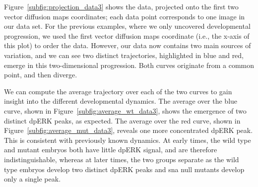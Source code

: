 \documentclass{pnastwo}
\begin{document}
\begin{article}
Figure~\ref{subfig:projection_data3} shows the data, projected onto the first two vector diffusion maps coordinates;
each data point corresponds to one image in our data set.
%
For the previous examples, where we only uncovered developmental progression, we used the first vector diffusion maps coordinate (i.e., the x-axis of this plot) to order the data. 
%
However, our data now contains two main sources of variation, and we can see two distinct trajectories, highlighted in blue and red, emerge in this two-dimensional progression.
%
Both curves originate from a common point, and then diverge. 

We can compute the average trajectory over each of the two curves to gain insight into the different developmental dynamics.
%
The average over the blue curve, shown in Figure~\ref{subfig:average_wt_data3}, shows the emergence of two distinct dpERK peaks, as expected.
%
The average over the red curve, shown in Figure~\ref{subfig:average_mut_data3}, reveals one more concentrated dpERK peak.
%
This is consistent with previously known dynamics.
%
At early times, the wild type and mutant embryos both have little dpERK signal, and are therefore indistinguishable, whereas at later times, the two groups separate as the wild type embryos develop two distinct dpERK peaks and sna null mutants develop only a single peak.


\end{article}
\end{document}
